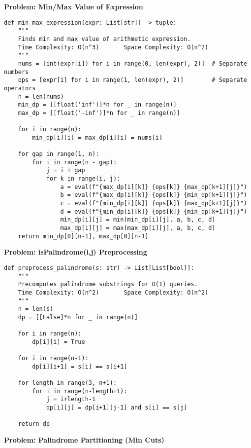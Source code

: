 \noindent\textbf{Problem: Min/Max Value of Expression}
\begin{verbatim}
def min_max_expression(expr: List[str]) -> tuple:
    """
    Finds min and max value of arithmetic expression.
    Time Complexity: O(n^3)       Space Complexity: O(n^2)
    """
    nums = [int(expr[i]) for i in range(0, len(expr), 2)]  # Separate numbers
    ops = [expr[i] for i in range(1, len(expr), 2)]        # Separate operators 
    n = len(nums)
    min_dp = [[float('inf')]*n for _ in range(n)]
    max_dp = [[float('-inf')]*n for _ in range(n)]
    
    for i in range(n):
        min_dp[i][i] = max_dp[i][i] = nums[i]
    
    for gap in range(1, n):
        for i in range(n - gap):
            j = i + gap
            for k in range(i, j):
                a = eval(f"{max_dp[i][k]} {ops[k]} {max_dp[k+1][j]}")
                b = eval(f"{max_dp[i][k]} {ops[k]} {min_dp[k+1][j]}")
                c = eval(f"{min_dp[i][k]} {ops[k]} {max_dp[k+1][j]}")
                d = eval(f"{min_dp[i][k]} {ops[k]} {min_dp[k+1][j]}")
                min_dp[i][j] = min(min_dp[i][j], a, b, c, d)
                max_dp[i][j] = max(max_dp[i][j], a, b, c, d)
    return min_dp[0][n-1], max_dp[0][n-1]
\end{verbatim}
\noindent\textbf{Problem: isPalindrome(i,j) Preprocessing}
\begin{verbatim}
def preprocess_palindrome(s: str) -> List[List[bool]]:
    """
    Precomputes palindrome substrings for O(1) queries.
    Time Complexity: O(n^2)       Space Complexity: O(n^2)
    """
    n = len(s)
    dp = [[False]*n for _ in range(n)]
    
    for i in range(n):
        dp[i][i] = True
    
    for i in range(n-1):
        dp[i][i+1] = s[i] == s[i+1]
    
    for length in range(3, n+1):
        for i in range(n-length+1):
            j = i+length-1
            dp[i][j] = dp[i+1][j-1] and s[i] == s[j]
    
    return dp
\end{verbatim}
\noindent\textbf{Problem: Palindrome Partitioning (Min Cuts)}
